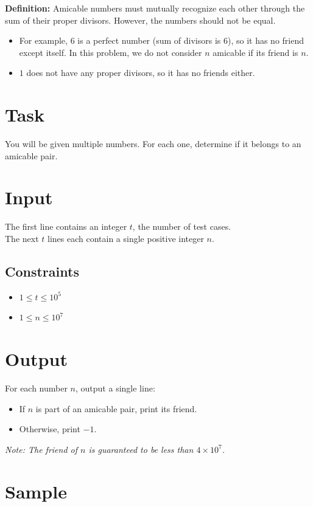 \documentclass[12pt, a4paper]{article}
\begin{document}
\vspace{0.3cm}
\noindent \textbf{Definition:}
Amicable numbers must mutually recognize each other through the sum of their proper divisors. However, the numbers should not be equal.
\begin{itemize}
    \item For example, $6$ is a perfect number (sum of divisors is $6$), so it has no friend except itself. In this problem, we do not consider $n$ amicable if its friend is $n$.
    \item $1$ does not have any proper divisors, so it has no friends either.
\end{itemize}

\section*{Task}
You will be given multiple numbers. For each one, determine if it belongs to an amicable pair.

\section*{Input}
The first line contains an integer $t$, the number of test cases. \\
The next $t$ lines each contain a single positive integer $n$.

\subsection*{Constraints}
\begin{itemize}
    \item $1 \le t \le 10^{5}$
    \item $1 \le n \le 10^{7}$
\end{itemize}

\section*{Output}
For each number $n$, output a single line:
\begin{itemize}
    \item If $n$ is part of an amicable pair, print its friend.
    \item Otherwise, print \texttt{$-1$}.
\end{itemize}
\textit{Note: The friend of $n$ is guaranteed to be less than $4\times10^{7}$.}

\section*{Sample}
\end{document}
